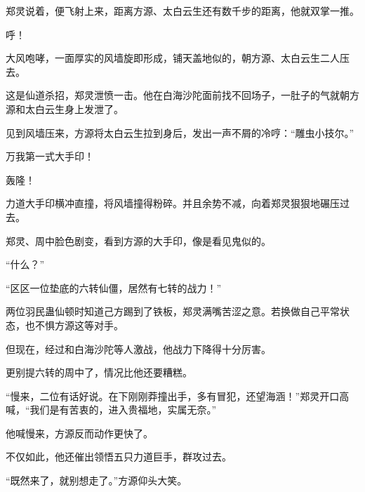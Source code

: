 \begin{this_body}
郑灵说着，便飞射上来，距离方源、太白云生还有数千步的距离，他就双掌一推。

呼！

大风咆哮，一面厚实的风墙旋即形成，铺天盖地似的，朝方源、太白云生二人压去。

这是仙道杀招，郑灵泄愤一击。他在白海沙陀面前找不回场子，一肚子的气就朝方源和太白云生身上发泄了。

见到风墙压来，方源将太白云生拉到身后，发出一声不屑的冷哼：“雕虫小技尔。”

万我第一式大手印！

轰隆！

力道大手印横冲直撞，将风墙撞得粉碎。并且余势不减，向着郑灵狠狠地碾压过去。

郑灵、周中脸色剧变，看到方源的大手印，像是看见鬼似的。

“什么？”

“区区一位垫底的六转仙僵，居然有七转的战力！”

两位羽民蛊仙顿时知道己方踢到了铁板，郑灵满嘴苦涩之意。若换做自己平常状态，也不惧方源这等对手。

但现在，经过和白海沙陀等人激战，他战力下降得十分厉害。

更别提六转的周中了，情况比他还要糟糕。

“慢来，二位有话好说。在下刚刚莽撞出手，多有冒犯，还望海涵！”郑灵开口高喊，“我们是有苦衷的，进入贵福地，实属无奈。”

他喊慢来，方源反而动作更快了。

不仅如此，他还催出领悟五只力道巨手，群攻过去。

“既然来了，就别想走了。”方源仰头大笑。

\end{this_body}

